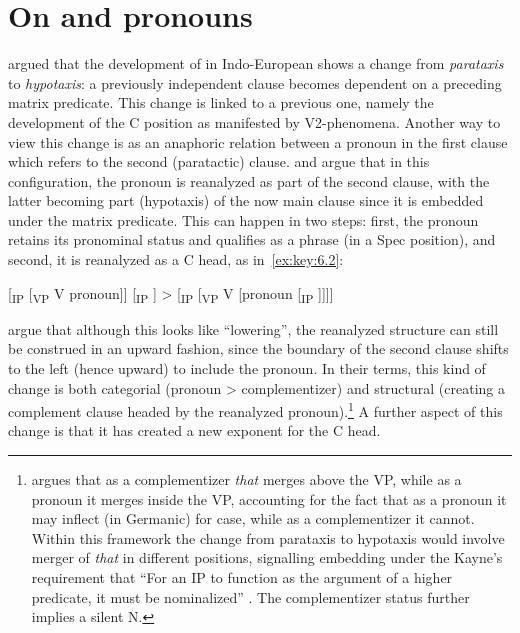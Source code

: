 \documentclass[output=paper]{langsci/langscibook}
\begin{document}
\section{On  and pronouns}\label{sec:comp-pron}

\citet{Kiparsky1995} argued that the development of  in
Indo-Eu\-ro\-pean shows a change from \emph{parataxis} to \emph{hypotaxis}: a
previously independent clause becomes dependent on a preceding matrix
predicate. This change is linked to a previous one, namely the development of
the C position as manifested by V2-phenomena. Another way to view this change
is as an anaphoric relation between a pronoun in the first clause which refers
to the second (paratactic) clause. \citet{RobRou2003} and
\citet{vanGelderen2004} argue that in this configuration, the pronoun is
reanalyzed as part of the second clause, with the latter becoming part
(hypotaxis) of the now main clause since it is embedded under the matrix
predicate. This can happen in two steps: first, the pronoun retains its
pronominal status and qualifies as a phrase (in a Spec position), and second,
it is reanalyzed as a C head, as in~\eqref{ex:key:6.2}:

\ea\label{ex:key:6.2}
   [\textsubscript{IP} [\textsubscript{VP} V pronoun]] [\textsubscript{IP} ] > [\textsubscript{IP} [\textsubscript{VP} V [pronoun [\textsubscript{IP} ]]]]
\z

\citet[118]{RobRou2003} argue that although this looks like \enquote{lowering},
the reanalyzed structure can still be construed in an upward fashion, since the
boundary of the second clause shifts to the left (hence upward) to include the
pronoun. In their terms, this kind of change is both categorial (pronoun > complementizer) and structural (creating a complement
clause headed by the reanalyzed pronoun).\footnote{\citet[238]{Kayne2005b}
    argues that as a complementizer \emph{that} merges
    above the VP, while as a pronoun it merges inside the VP, accounting for
    the fact that as a pronoun it may inflect (in Germanic) for case, while as
    a complementizer it cannot.  Within this framework the
    change from parataxis to hypotaxis would involve merger of \emph{that} in
    different positions, signalling embedding under the Kayne’s requirement
that \enquote{For an IP to function as the argument of a higher predicate, it
must be nominalized} \parencite[236]{Kayne2005b}.  The
complementizer status further implies a silent
N.\label{fn:4.2}} A
further aspect of this change is that it has created a new exponent for the C
head.
\end{document}
